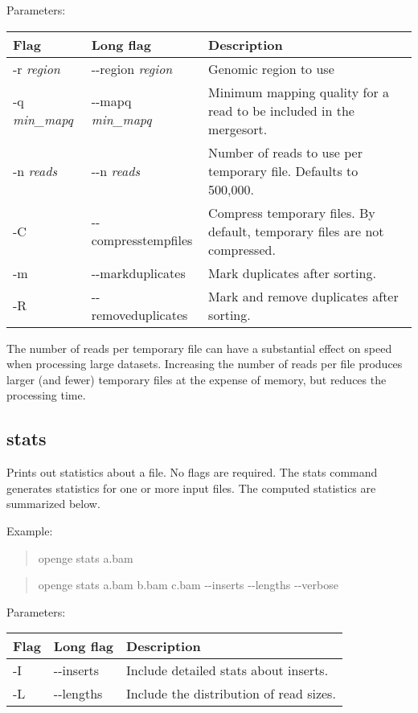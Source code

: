 \documentclass[11pt]{article}
\newcommand {\cmd}[1] {\begin{quote}#1\end{quote}}
\begin{document}
Parameters:
\begin{center}
\begin{tabular}{llp{3.5in}}
\hline
Flag&Long flag&Description\\ \hline
-r \textit{region}&{-}{-}region \textit{region}&Genomic region to use\\
-q \textit{min\_mapq}&{-}{-}mapq \textit{min\_mapq}&Minimum mapping quality for a read to be included in the mergesort.\\
-n \textit{reads}&{-}{-}n \textit{reads}&Number of reads to use per temporary file. Defaults to 500,000.\\
-C&{-}{-}compresstempfiles&Compress temporary files. By default, temporary files are not compressed.\\
-m&{-}{-}markduplicates&Mark duplicates after sorting.\\
-R&{-}{-}removeduplicates&Mark and remove duplicates after sorting.\\
\end{tabular}
\end{center}

The number of reads per temporary file can have a substantial effect on speed when processing large datasets. Increasing the number of reads per file produces larger (and fewer) temporary files at the expense of memory, but reduces the processing time.

\subsection{stats}
Prints out statistics about a file. No flags are required.
The stats command generates statistics for one or more input files. The computed statistics are summarized below.

Example:

\cmd{openge stats a.bam}
\cmd{openge stats a.bam b.bam c.bam {-}{-}inserts {-}{-}lengths {-}{-}verbose}
Parameters:
\begin{center}
\begin{tabular}{llp{3.5in}}
\hline
Flag&Long flag&Description\\ \hline
-I&{-}{-}inserts&Include detailed stats about inserts.\\
-L&{-}{-}lengths&Include the distribution of read sizes.\\
\end{tabular}
\end{center}
\end{document}
